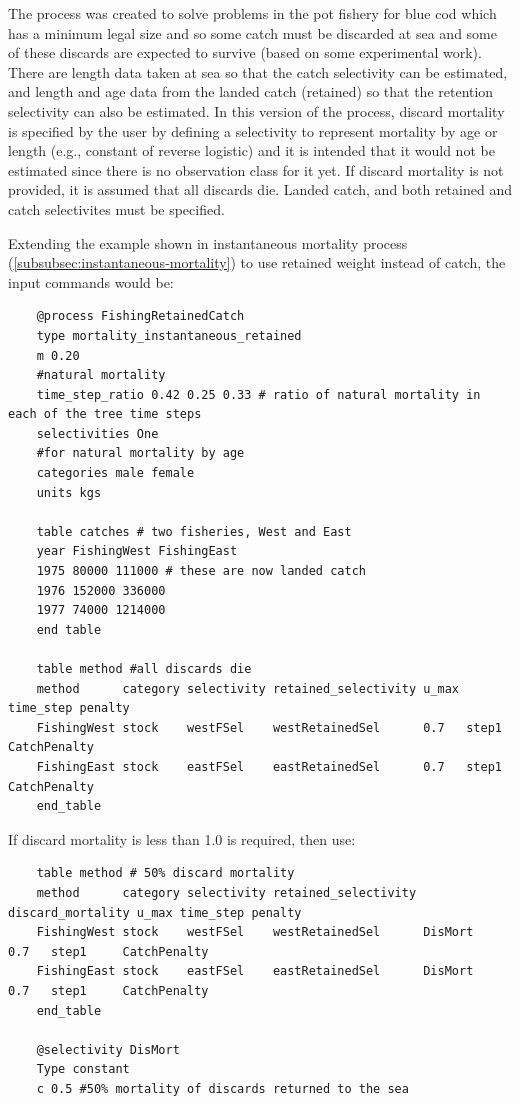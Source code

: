 The process was created to solve problems in the pot fishery for blue cod which has a minimum legal size and so some catch must be discarded at sea and some of these discards are expected to survive (based on some experimental work). There are length data taken at sea so that the catch selectivity can be estimated, and length and age data from the landed catch (retained) so that the retention selectivity can also be estimated. In this version of the process, discard mortality is specified by the user by defining a selectivity to represent mortality by age or length (e.g., constant of reverse logistic) and it is intended that it would not be estimated since there is no observation class for it yet. If discard mortality is not provided, it is assumed that all discards die. Landed catch, and both retained and catch selectivites must be specified.

Extending the example shown in instantaneous mortality process (\ref{subsubsec:instantaneous-mortality}) to use retained weight instead of catch, the input commands would be:

{\small{\begin{verbatim}
    @process FishingRetainedCatch
    type mortality_instantaneous_retained
    m 0.20
    #natural mortality
    time_step_ratio 0.42 0.25 0.33 # ratio of natural mortality in each of the tree time steps
    selectivities One
    #for natural mortality by age
    categories male female
    units kgs

    table catches # two fisheries, West and East
    year FishingWest FishingEast
    1975 80000 111000 # these are now landed catch
    1976 152000 336000
    1977 74000 1214000
    end table

    table method #all discards die
    method      category selectivity retained_selectivity u_max time_step penalty
    FishingWest stock    westFSel    westRetainedSel      0.7   step1     CatchPenalty
    FishingEast stock    eastFSel    eastRetainedSel      0.7   step1     CatchPenalty
    end_table
    \end{verbatim}}}

If discard mortality is less than 1.0 is required, then use:

{\small{\begin{verbatim}
    table method # 50% discard mortality
    method      category selectivity retained_selectivity discard_mortality u_max time_step penalty
    FishingWest stock    westFSel    westRetainedSel      DisMort           0.7   step1     CatchPenalty
    FishingEast stock    eastFSel    eastRetainedSel      DisMort           0.7   step1     CatchPenalty
    end_table

    @selectivity DisMort
    Type constant
    c 0.5 #50% mortality of discards returned to the sea
    \end{verbatim}}}

